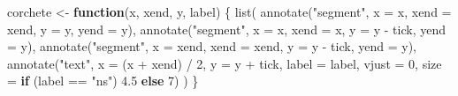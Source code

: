 \documentclass[
  letterpaper,
  DIV=11,
  numbers=noendperiod]{scrartcl}
\newenvironment{Shaded}{\begin{snugshade}}{\end{snugshade}}
\newcommand{\AttributeTok}[1]{\textcolor[rgb]{0.40,0.45,0.13}{#1}}
\newcommand{\ControlFlowTok}[1]{\textcolor[rgb]{0.00,0.23,0.31}{\textbf{#1}}}
\newcommand{\DecValTok}[1]{\textcolor[rgb]{0.68,0.00,0.00}{#1}}
\newcommand{\FloatTok}[1]{\textcolor[rgb]{0.68,0.00,0.00}{#1}}
\newcommand{\FunctionTok}[1]{\textcolor[rgb]{0.28,0.35,0.67}{#1}}
\newcommand{\NormalTok}[1]{\textcolor[rgb]{0.00,0.23,0.31}{#1}}
\newcommand{\OtherTok}[1]{\textcolor[rgb]{0.00,0.23,0.31}{#1}}
\newcommand{\SpecialCharTok}[1]{\textcolor[rgb]{0.37,0.37,0.37}{#1}}
\newcommand{\StringTok}[1]{\textcolor[rgb]{0.13,0.47,0.30}{#1}}
\begin{document}
\begin{Shaded}
\begin{Highlighting}[]
\NormalTok{corchete }\OtherTok{\textless{}{-}} \ControlFlowTok{function}\NormalTok{(x, xend, y, label) \{}
  \FunctionTok{list}\NormalTok{(}
    \FunctionTok{annotate}\NormalTok{(}\StringTok{"segment"}\NormalTok{, }\AttributeTok{x =}\NormalTok{ x,    }\AttributeTok{xend =}\NormalTok{ xend, }\AttributeTok{y =}\NormalTok{ y,        }\AttributeTok{yend =}\NormalTok{ y),}
    \FunctionTok{annotate}\NormalTok{(}\StringTok{"segment"}\NormalTok{, }\AttributeTok{x =}\NormalTok{ x,    }\AttributeTok{xend =}\NormalTok{ x,    }\AttributeTok{y =}\NormalTok{ y }\SpecialCharTok{{-}}\NormalTok{ tick, }\AttributeTok{yend =}\NormalTok{ y),}
    \FunctionTok{annotate}\NormalTok{(}\StringTok{"segment"}\NormalTok{, }\AttributeTok{x =}\NormalTok{ xend, }\AttributeTok{xend =}\NormalTok{ xend, }\AttributeTok{y =}\NormalTok{ y }\SpecialCharTok{{-}}\NormalTok{ tick, }\AttributeTok{yend =}\NormalTok{ y),}
    \FunctionTok{annotate}\NormalTok{(}\StringTok{"text"}\NormalTok{, }\AttributeTok{x =}\NormalTok{ (x }\SpecialCharTok{+}\NormalTok{ xend) }\SpecialCharTok{/} \DecValTok{2}\NormalTok{, }\AttributeTok{y =}\NormalTok{ y }\SpecialCharTok{+}\NormalTok{ tick, }\AttributeTok{label =}\NormalTok{ label,}
             \AttributeTok{vjust =} \DecValTok{0}\NormalTok{, }\AttributeTok{size =} \ControlFlowTok{if}\NormalTok{ (label }\SpecialCharTok{==} \StringTok{"ns"}\NormalTok{) }\FloatTok{4.5} \ControlFlowTok{else} \DecValTok{7}\NormalTok{)}
\NormalTok{  )}
\NormalTok{\}}


\end{Highlighting}
\end{Shaded}
\end{document}

